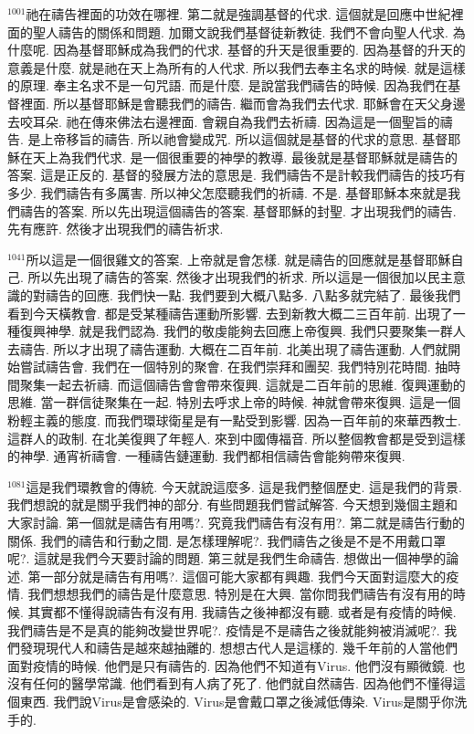 \documentclass{book}
\begin{document}
$^{1001}$祂在禱告裡面的功效在哪裡.
第二就是強調基督的代求.
這個就是回應中世紀裡面的聖人禱告的關係和問題.
加爾文說我們基督徒新教徒.
我們不會向聖人代求.
為什麼呢.
因為基督耶穌成為我們的代求.
基督的升天是很重要的.
因為基督的升天的意義是什麼.
就是祂在天上為所有的人代求.
所以我們去奉主名求的時候.
就是這樣的原理.
奉主名求不是一句咒語.
而是什麼.
是說當我們禱告的時候.
因為我們在基督裡面.
所以基督耶穌是會聽我們的禱告.
繼而會為我們去代求.
耶穌會在天父身邊去咬耳朵.
祂在傳來佛法右邊裡面.
會親自為我們去祈禱.
因為這是一個聖旨的禱告.
是上帝移旨的禱告.
所以祂會變成咒.
所以這個就是基督的代求的意思.
基督耶穌在天上為我們代求.
是一個很重要的神學的教導.
最後就是基督耶穌就是禱告的答案.
這是正反的.
基督的發展方法的意思是.
我們禱告不是計較我們禱告的技巧有多少.
我們禱告有多厲害.
所以神父怎麼聽我們的祈禱.
不是.
基督耶穌本來就是我們禱告的答案.
所以先出現這個禱告的答案.
基督耶穌的封聖.
才出現我們的禱告.
先有應許.
然後才出現我們的禱告祈求.

$^{1041}$所以這是一個很雞文的答案.
上帝就是會怎樣.
就是禱告的回應就是基督耶穌自己.
所以先出現了禱告的答案.
然後才出現我們的祈求.
所以這是一個很加以民主意識的對禱告的回應.
我們快一點.
我們要到大概八點多.
八點多就完結了.
最後我們看到今天橫教會.
都是受某種禱告運動所影響.
去到新教大概二三百年前.
出現了一種復興神學.
就是我們認為.
我們的敬虔能夠去回應上帝復興.
我們只要聚集一群人去禱告.
所以才出現了禱告運動.
大概在二百年前.
北美出現了禱告運動.
人們就開始嘗試禱告會.
我們在一個特別的聚會.
在我們崇拜和團契.
我們特別花時間.
抽時間聚集一起去祈禱.
而這個禱告會會帶來復興.
這就是二百年前的思維.
復興運動的思維.
當一群信徒聚集在一起.
特別去呼求上帝的時候.
神就會帶來復興.
這是一個粉輕主義的態度.
而我們環球衛星是有一點受到影響.
因為一百年前的來華西教士.
這群人的政制.
在北美復興了年輕人.
來到中國傳福音.
所以整個教會都是受到這樣的神學.
通宵祈禱會.
一種禱告鏈運動.
我們都相信禱告會能夠帶來復興.

$^{1081}$這是我們環教會的傳統.
今天就說這麼多.
這是我們整個歷史.
這是我們的背景.
我們想說的就是關乎我們神的部分.
有些問題我們嘗試解答.
今天想到幾個主題和大家討論.
第一個就是禱告有用嗎?.
究竟我們禱告有沒有用?.
第二就是禱告行動的關係.
我們的禱告和行動之間.
是怎樣理解呢?.
我們禱告之後是不是不用戴口罩呢?.
這就是我們今天要討論的問題.
第三就是我們生命禱告.
想做出一個神學的論述.
第一部分就是禱告有用嗎?.
這個可能大家都有興趣.
我們今天面對這麼大的疫情.
我們想想我們的禱告是什麼意思.
特別是在大興.
當你問我們禱告有沒有用的時候.
其實都不懂得說禱告有沒有用.
我禱告之後神都沒有聽.
或者是有疫情的時候.
我們禱告是不是真的能夠改變世界呢?.
疫情是不是禱告之後就能夠被消滅呢?.
我們發現現代人和禱告是越來越抽離的.
想想古代人是這樣的.
幾千年前的人當他們面對疫情的時候.
他們是只有禱告的.
因為他們不知道有Virus.
他們沒有顯微鏡.
也沒有任何的醫學常識.
他們看到有人病了死了.
他們就自然禱告.
因為他們不懂得這個東西.
我們說Virus是會感染的.
Virus是會戴口罩之後減低傳染.
Virus是關乎你洗手的.
\end{document}
